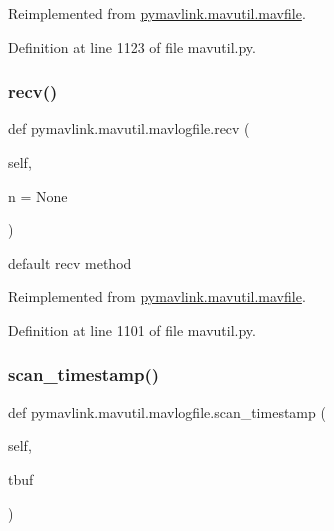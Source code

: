 Reimplemented from \mbox{\hyperlink{classpymavlink_1_1mavutil_1_1mavfile_ad0ea96f4450b27d0327d9060d55e05be}{pymavlink.\+mavutil.\+mavfile}}.



Definition at line 1123 of file mavutil.\+py.

\mbox{\label{classpymavlink_1_1mavutil_1_1mavlogfile_a3517f0936b24f1aa60ec3c90b729665e}} 
\subsubsection{\texorpdfstring{recv()}{recv()}}
{\footnotesize\ttfamily def pymavlink.\+mavutil.\+mavlogfile.\+recv (\begin{DoxyParamCaption}\item[{}]{self,  }\item[{}]{n = {\ttfamily None} }\end{DoxyParamCaption})}

\begin{DoxyVerb}default recv method\end{DoxyVerb}
 

Reimplemented from \mbox{\hyperlink{classpymavlink_1_1mavutil_1_1mavfile_a09cb800fc6b03949ace05ce320539be2}{pymavlink.\+mavutil.\+mavfile}}.



Definition at line 1101 of file mavutil.\+py.

\mbox{\label{classpymavlink_1_1mavutil_1_1mavlogfile_a53edd3e229ee05b6e9d3401d0d940bfc}} 
\subsubsection{\texorpdfstring{scan\_timestamp()}{scan\_timestamp()}}
{\footnotesize\ttfamily def pymavlink.\+mavutil.\+mavlogfile.\+scan\+\_\+timestamp (\begin{DoxyParamCaption}\item[{}]{self,  }\item[{}]{tbuf }\end{DoxyParamCaption})}

